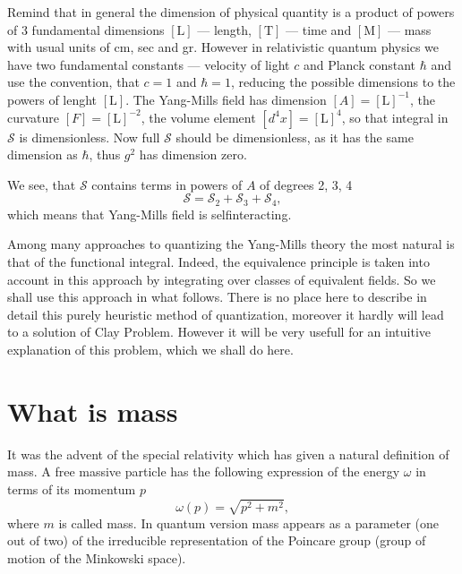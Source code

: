 \documentclass[12pt]{article}
\newcommand{\AAA}{\mathcal{S}}
\newcommand{\Length}{\text{L}}
\newcommand{\Mass}{\text{M}}
\newcommand{\Time}{\text{T}}
\begin{document}
	Remind that in general the dimension of physical quantity
	is a product of powers of 3 fundamental dimensions
    $ [ \Length ] $ ---
	length,
    $ [ \Time ] $ ---
	time and
    $ [ \Mass ] $ ---
	mass with usual units of cm, sec and gr. However in
	relativistic quantum physics we have two fundamental constants ---
	velocity of light
    $ c $
	and Planck constant
    $ \hbar $
	and use the convention, that
    $ c = 1 $ and
    $ \hbar = 1 $,
	reducing the possible dimensions to the powers of lenght
    $ [ \Length ] $.
	The Yang-Mills field has dimension
    $ [ A ] = [ \Length ]^{-1} $,
	the curvature
    $ [ F ] = [ \Length ]^{-2} $,
	the volume element
    $ [ d^{4}x ] = [ \Length ]^{4} $,
	so that integral in
    $ \AAA $
	is dimensionless.
	Now full
    $ \AAA $
	should be dimensionless, as it has the same dimension as
    $ \hbar $,
	thus 
    $ g^{2} $
	has dimension zero.

	We see, that
    $ \AAA $
	contains terms in powers of
    $ A $
	of degrees 2, 3, 4
\begin{equation*}
        \AAA = \AAA_{2} + \AAA_{3} + \AAA_{4} ,
\end{equation*}
	which means that Yang-Mills field is selfinteracting.

	Among many approaches to quantizing the Yang-Mills theory
	the most natural is that of the functional integral. 
	Indeed, the equivalence principle is taken into account in
	this approach by integrating over classes of equivalent
	fields. 
	So we shall use this approach in what follows.
	There is no place here to describe in detail this purely
	heuristic method
	of quantization, moreover it hardly will lead to a solution
	of Clay Problem. 
	However it will be very usefull for an intuitive explanation
	of this problem, which we shall do here.

\section{What is mass}
	It was the advent of the special relativity which has given a
	natural definition of mass. A free massive particle has 
	the following expression of the energy
    $ \omega $
	in terms of its momentum
    $ p $
\begin{equation*}
	\omega(p) = \sqrt{p^{2} + m^{2}} ,
\end{equation*}
	where
    $ m $
	is called mass.
	In quantum version mass appears as a parameter (one out of two)
	of the irreducible representation of the Poincare group
	(group of motion of the Minkowski space).
\end{document}
